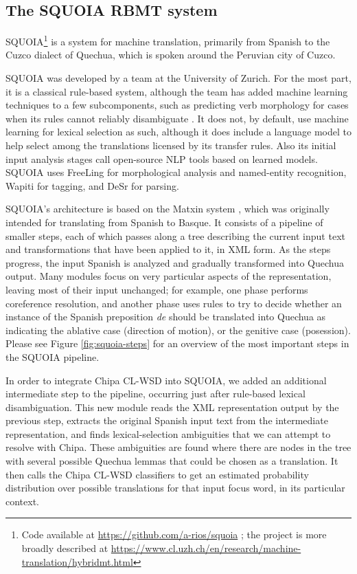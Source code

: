 \subsection{The SQUOIA RBMT system}
SQUOIA\footnote{Code available at \url{https://github.com/a-rios/squoia} ;
the project is more broadly described at
\url{https://www.cl.uzh.ch/en/research/machine-translation/hybridmt.html}}
is a system for machine translation, primarily from Spanish to the Cuzco
dialect of Quechua, which is spoken around the Peruvian city of Cuzco.

SQUOIA was developed by a team at the University of Zurich. For the most part,
it is a classical rule-based system, although the team has added machine
learning techniques to a few subcomponents, such as predicting verb morphology
for cases when its rules cannot reliably disambiguate
\cite{riosgonzales-gohring:2013:HyTra}. It does not, by default, use machine
learning for lexical selection as such, although it does include a language
model to help select among the translations licensed by its transfer rules.
Also its initial input analysis stages call open-source NLP tools based on
learned models. SQUOIA uses FreeLing \cite{padro12} for morphological analysis
and named-entity recognition, Wapiti \cite{lavergne2010practical} for tagging,
and DeSr \cite{attardi-EtAl:2007:EMNLP-CoNLL2007} for parsing.

SQUOIA's architecture is based on the Matxin system \cite{matxin2005}, which
was originally intended for translating from Spanish to Basque. It consists of
a pipeline of smaller steps, each of which passes along a tree describing the
current input text and transformations that have been applied to it, in XML
form. As the steps progress, the input Spanish is analyzed and gradually
transformed into Quechua output. Many modules focus on very particular aspects
of the representation, leaving most of their input unchanged; for example, one
phase performs coreference resolution, and another phase uses rules to try to
decide whether an instance of the Spanish preposition \emph{de} should be
translated into Quechua as indicating the ablative case (direction of motion),
or the genitive case (posession). Please see Figure \ref{fig:squoia-steps} for
an overview of the most important steps in the SQUOIA pipeline.

In order to integrate Chipa CL-WSD into SQUOIA, we added an additional
intermediate step to the pipeline, occurring just after rule-based lexical
disambiguation. This new module reads the XML representation output by the
previous step, extracts the original Spanish input text from the intermediate
representation, and finds lexical-selection ambiguities that we can attempt to
resolve with Chipa. These ambiguities are found where there are nodes in the
tree with several possible Quechua lemmas that could be chosen as a
translation. It then calls the Chipa CL-WSD classifiers to get an estimated
probability distribution over possible translations for that input focus word,
in its particular context.

